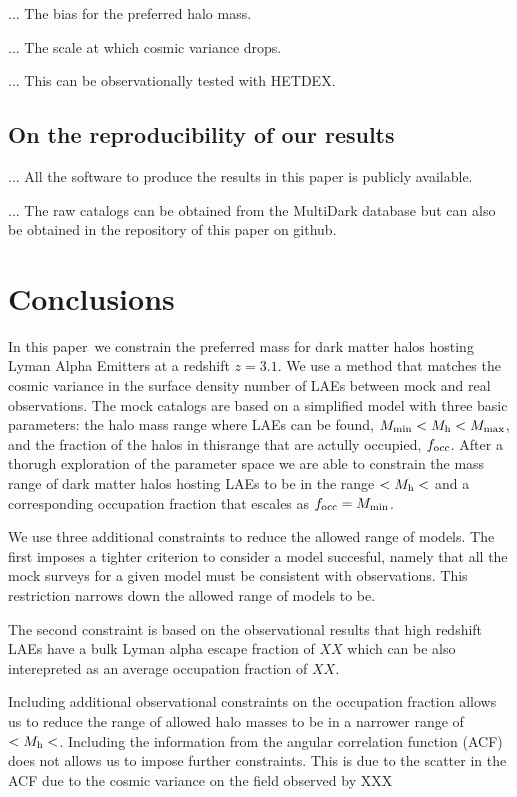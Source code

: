 \documentclass[usenatbib]{mn2e}
\newcommand{\documentname}{paper~}
\begin{document}
... The bias for the preferred halo mass.

... The scale at which cosmic variance drops.

... This can be observationally tested with HETDEX.

\subsection{On the reproducibility of our results}

... All the software to produce the results in this paper is publicly
available. 

... The raw catalogs can be obtained from the MultiDark database but
can also be obtained in the repository of this paper on github.

\section{Conclusions}
In this \documentname we constrain the preferred mass for dark matter
halos hosting Lyman Alpha Emitters at a redshift $z=3.1$. We use a
method that matches the cosmic variance in the surface
density number of LAEs between mock and real observations. The mock
catalogs are based on a simplified model with three basic parameters: the halo
mass range where LAEs can be found, $M_{\rm   min}<M_{\rm h}<M_{\rm
  max}$, and the fraction of the halos in thisrange that are actully
occupied, $f_{\rm occ}$. After a thorugh exploration of the parameter
space we are able to constrain the mass range of dark matter halos
hosting LAEs to be in the range $<M_{\rm   h}<$ and a corresponding
occupation fraction that escales as $f_{\rm   occ} = M_{\rm min}$. 

We use three additional constraints to reduce the allowed
range of models. The first imposes a tighter criterion to consider a
model succesful, namely that all the mock surveys for a given model
must be consistent with observations. This restriction narrows down
the allowed range of models to be. 

The second constraint is based on the observational results that high
redshift LAEs have a bulk Lyman alpha escape fraction of $XX$ which
can be also interepreted as an average occupation fraction of $XX$.

Including additional observational constraints on the occupation
fraction allows us to reduce the range of allowed halo masses to be in
a narrower range of $<M_{\rm h}<$. Including the information from the
angular correlation function (ACF) does not allows us to impose
further constraints. This is due to the scatter in the ACF due to the
cosmic variance on the field observed by XXX
\end{document}
